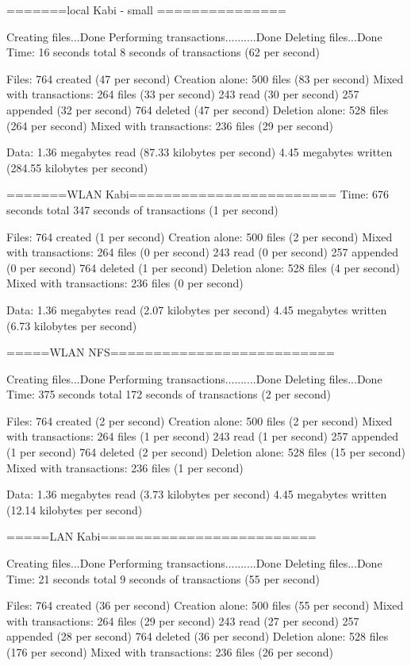 =======local Kabi - small ===============

Creating files...Done
Performing transactions..........Done
Deleting files...Done
Time:
	16 seconds total
	8 seconds of transactions (62 per second)

Files:
	764 created (47 per second)
		Creation alone: 500 files (83 per second)
		Mixed with transactions: 264 files (33 per second)
	243 read (30 per second)
	257 appended (32 per second)
	764 deleted (47 per second)
		Deletion alone: 528 files (264 per second)
		Mixed with transactions: 236 files (29 per second)

Data:
	1.36 megabytes read (87.33 kilobytes per second)
	4.45 megabytes written (284.55 kilobytes per second)

=======WLAN Kabi========================
Time:
	676 seconds total
	347 seconds of transactions (1 per second)

Files:
	764 created (1 per second)
		Creation alone: 500 files (2 per second)
		Mixed with transactions: 264 files (0 per second)
	243 read (0 per second)
	257 appended (0 per second)
	764 deleted (1 per second)
		Deletion alone: 528 files (4 per second)
		Mixed with transactions: 236 files (0 per second)

Data:
	1.36 megabytes read (2.07 kilobytes per second)
	4.45 megabytes written (6.73 kilobytes per second)

=====WLAN NFS==========================

Creating files...Done
Performing transactions..........Done
Deleting files...Done
Time:
	375 seconds total
	172 seconds of transactions (2 per second)

Files:
	764 created (2 per second)
		Creation alone: 500 files (2 per second)
		Mixed with transactions: 264 files (1 per second)
	243 read (1 per second)
	257 appended (1 per second)
	764 deleted (2 per second)
		Deletion alone: 528 files (15 per second)
		Mixed with transactions: 236 files (1 per second)

Data:
	1.36 megabytes read (3.73 kilobytes per second)
	4.45 megabytes written (12.14 kilobytes per second)

=====LAN Kabi=========================

Creating files...Done
Performing transactions..........Done
Deleting files...Done
Time:
	21 seconds total
	9 seconds of transactions (55 per second)

Files:
	764 created (36 per second)
		Creation alone: 500 files (55 per second)
		Mixed with transactions: 264 files (29 per second)
	243 read (27 per second)
	257 appended (28 per second)
	764 deleted (36 per second)
		Deletion alone: 528 files (176 per second)
		Mixed with transactions: 236 files (26 per second)

